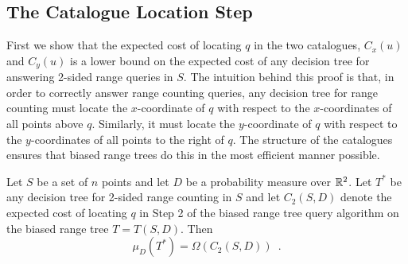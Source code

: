 \documentclass[charterfonts]{patmorin}
\begin{document}
\subsection{The Catalogue Location Step}

First we show that the expected cost of locating $q$ in the two
catalogues, $C_x(u)$ and $C_y(u)$ is
a lower bound on the expected cost of any decision tree for answering
2-sided range queries in $S$.  The intuition behind this proof is
that, in order to correctly answer range counting queries, any decision tree
for range counting must locate the $x$-coordinate of $q$
with respect to the $x$-coordinates of all points above $q$.  
Similarly, it must locate the $y$-coordinate of $q$ with respect to
the $y$-coordinates of all points to the right of $q$.  The structure
of the catalogues ensures that biased range trees do this in the most
efficient manner possible.
 

\begin{lem}
Let $S$ be a set of $n$ points and let $D$ be a probability measure
over $\mathbb{R}^2$.
Let $T^*$ be any decision tree for 2-sided range counting in $S$ and let
$C_2(S,D)$ denote the expected cost of locating $q$ in Step 2 of the
biased range tree query algorithm on the biased range tree $T=T(S,D)$. 
Then
\[
  \mu_D(T^*) = \Omega(C_2(S,D)) \enspace .
\] 
\end{lem}
\end{document}
